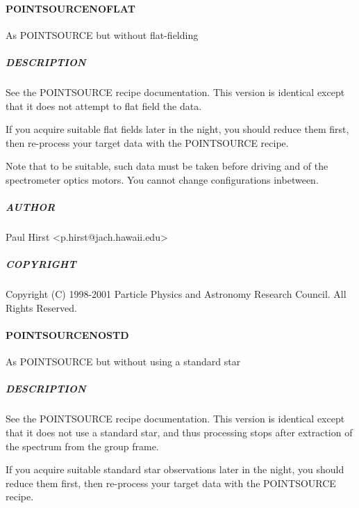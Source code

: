 \documentclass[twoside,11pt]{article}
\renewcommand{\_}{\texttt{\symbol{95}}}
\begin{document}
\paragraph*{POINT\_SOURCE\_NOFLAT\label{POINT_SOURCE_NOFLAT}}

As POINT\_SOURCE but without flat-fielding

\subparagraph*{DESCRIPTION\label{POINT_SOURCE_NOFLAT_DESCRIPTION}}

See the POINT\_SOURCE recipe documentation. This version is identical except
that it does not attempt to flat field the data.



If you acquire suitable flat fields later in the night, you should
reduce them first, then re-process your target data with the
POINT\_SOURCE recipe.



Note that to be suitable, such data must be taken before driving and
of the spectrometer optics motors. You cannot change configurations
inbetween.

\subparagraph*{AUTHOR\label{POINT_SOURCE_NOFLAT_AUTHOR}}

Paul Hirst <p.hirst@jach.hawaii.edu>

\subparagraph*{COPYRIGHT\label{POINT_SOURCE_NOFLAT_COPYRIGHT}}

Copyright (C) 1998-2001 Particle Physics and Astronomy Research
Council. All Rights Reserved.

\paragraph*{POINT\_SOURCE\_NOSTD\label{POINT_SOURCE_NOSTD}}

As POINT\_SOURCE but without using a standard star

\subparagraph*{DESCRIPTION\label{POINT_SOURCE_NOSTD_DESCRIPTION}}

See the POINT\_SOURCE recipe documentation. This version is identical
except that it does not use a standard star, and thus processing stops
after extraction of the spectrum from the group frame.



If you acquire suitable standard star observations later in the night,
you should reduce them first, then re-process your target data with
the POINT\_SOURCE recipe.
\end{document}
